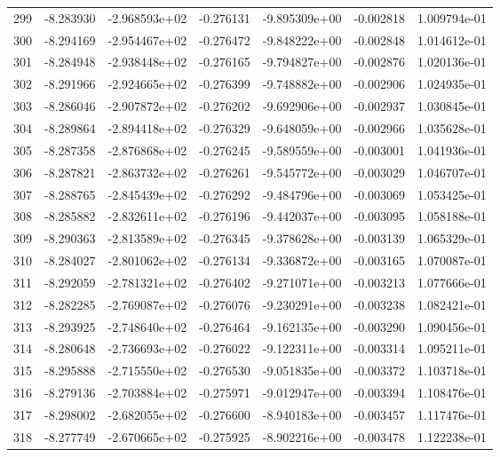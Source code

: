 \begin{tabular}{rrrrrrr}
 299 &  -8.283930 & -2.968593e+02 & -0.276131 & -9.895309e+00 &   -0.002818 &  1.009794e-01 \\
 300 &  -8.294169 & -2.954467e+02 & -0.276472 & -9.848222e+00 &   -0.002848 &  1.014612e-01 \\
 301 &  -8.284948 & -2.938448e+02 & -0.276165 & -9.794827e+00 &   -0.002876 &  1.020136e-01 \\
 302 &  -8.291966 & -2.924665e+02 & -0.276399 & -9.748882e+00 &   -0.002906 &  1.024935e-01 \\
 303 &  -8.286046 & -2.907872e+02 & -0.276202 & -9.692906e+00 &   -0.002937 &  1.030845e-01 \\
 304 &  -8.289864 & -2.894418e+02 & -0.276329 & -9.648059e+00 &   -0.002966 &  1.035628e-01 \\
 305 &  -8.287358 & -2.876868e+02 & -0.276245 & -9.589559e+00 &   -0.003001 &  1.041936e-01 \\
 306 &  -8.287821 & -2.863732e+02 & -0.276261 & -9.545772e+00 &   -0.003029 &  1.046707e-01 \\
 307 &  -8.288765 & -2.845439e+02 & -0.276292 & -9.484796e+00 &   -0.003069 &  1.053425e-01 \\
 308 &  -8.285882 & -2.832611e+02 & -0.276196 & -9.442037e+00 &   -0.003095 &  1.058188e-01 \\
 309 &  -8.290363 & -2.813589e+02 & -0.276345 & -9.378628e+00 &   -0.003139 &  1.065329e-01 \\
 310 &  -8.284027 & -2.801062e+02 & -0.276134 & -9.336872e+00 &   -0.003165 &  1.070087e-01 \\
 311 &  -8.292059 & -2.781321e+02 & -0.276402 & -9.271071e+00 &   -0.003213 &  1.077666e-01 \\
 312 &  -8.282285 & -2.769087e+02 & -0.276076 & -9.230291e+00 &   -0.003238 &  1.082421e-01 \\
 313 &  -8.293925 & -2.748640e+02 & -0.276464 & -9.162135e+00 &   -0.003290 &  1.090456e-01 \\
 314 &  -8.280648 & -2.736693e+02 & -0.276022 & -9.122311e+00 &   -0.003314 &  1.095211e-01 \\
 315 &  -8.295888 & -2.715550e+02 & -0.276530 & -9.051835e+00 &   -0.003372 &  1.103718e-01 \\
 316 &  -8.279136 & -2.703884e+02 & -0.275971 & -9.012947e+00 &   -0.003394 &  1.108476e-01 \\
 317 &  -8.298002 & -2.682055e+02 & -0.276600 & -8.940183e+00 &   -0.003457 &  1.117476e-01 \\
 318 &  -8.277749 & -2.670665e+02 & -0.275925 & -8.902216e+00 &   -0.003478 &  1.122238e-01 \\

\end{tabular}
